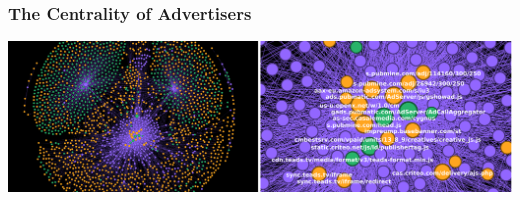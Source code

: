 \documentclass[aspectratio=169]{beamer}
\renewcommand{\large}{\fontsize{16pt}{24pt}\selectfont}
\begin{document}
\begin{frame}
\frametitle{The Centrality of Advertisers}
\large{Are trackers the new backbone of the Web?}
\begin{center}
\includegraphics[width=0.85\paperwidth]{0thN-8lZ4H2_xjbkt.png}
\end{center}



\end{frame}
\end{document}
